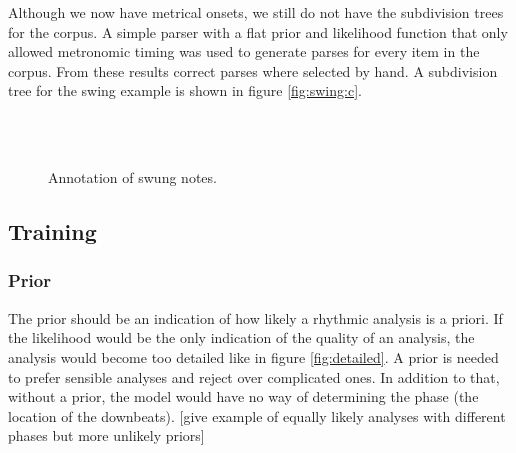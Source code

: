 Although we now have metrical onsets, we still do not have the subdivision trees for the corpus. A simple parser with a flat prior and likelihood function that only allowed metronomic timing was used to generate parses for every item in the corpus. From these results correct parses where selected by hand. A subdivision tree for the swing example is shown in figure \ref{fig:swing:c}.


\begin{figure}
\centering
{}
\\
\\
\caption{Annotation of swung notes.}
\end{figure}

\subsection{Training}

\subsubsection{Prior}

The prior should be an indication of how likely a rhythmic analysis is a priori. If the likelihood would be the only indication of the quality of an analysis, the analysis would become too detailed like in figure \ref{fig:detailed}. A prior is needed to prefer sensible analyses and reject over complicated ones. In addition to that, without a prior, the model would have no way of determining the phase (the location of the downbeats). [give example of equally likely analyses with different phases but more unlikely priors]

